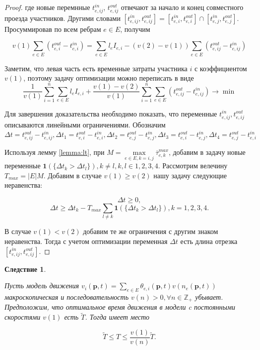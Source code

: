 \documentclass[12pt, a4paper]{article}
\DeclareMathOperator*{\minn}{min}
\newtheorem{corollary}{Следствие}[section]
\begin{document}
\begin{proof}
	где новые перемнные $t_{e, ij}^{in}$, $t_{e, ij}^{out}$ отвечают за начало и конец совместного проезда участников. Другими словами $[t_{e, ij}^{in}, t_{e, ij}^{out}] = [t_{e, i}^{in}, t_{e, i}^{out}] \cap [t_{e, j}^{in}, t_{e, j}^{out}]$. Просуммировав по всем ребрам $e \in E$, получим
	
	$$v(1) \sum \limits _{e \in E} (t_{e, i}^{out} - t_{e, i}^{in}) = \sum \limits _{e \in E} l_e I_{e, i} - (v(2) - v(1)) \sum \limits _{e \in E} (t_{e, ij}^{out} - t_{e, ij}^{in})$$
	
	Заметим, что левая часть есть временные затраты участника $i$ с коэффициентом $v(1)$, поэтому задачу оптимизации можно переписать в виде
	$$ \frac{1}{v (1)} \sum\limits_{i = 1}^n \sum \limits _{e \in E} l_e I_{e, i} + \frac{v(1) - v(2)}{v (1)}  \sum\limits_{i = 1}^n \sum \limits _{e \in E} (t_{e, ij}^{out} - t_{e, ij}^{in}) \rightarrow \minn $$
	
	Для завершения доказательства необходимо показать, что переменные $t_{e, ij}^{in}, t_{e, ij}^{out}$ описываются линейными ограничениями. Обозначим $\Delta t = t_{e, ij}^{out} - t_{e, ij}^{in}, \Delta t_1 =  t_{e, i}^{out} - t_{e, i}^{in}, \Delta t_2 =  t_{e, j}^{out} - t_{e, j}^{in}, \Delta t_3 =  t_{e, i}^{out} - t_{e, j}^{in}, \Delta t_4 =  t_{e, j}^{out} - t_{e, i}^{in}$
	
	Используя лемму \ref{lemma:lt}, при $M = \max\limits_{e \in E, k = i, j} \overline{\tau}_{e, k}^{max}$, добавим в задачу новые переменные $\textbf{1} (\{ \Delta t_k > \Delta t_l\}), k \ne l, k, l \in {1, 2, 3, 4}$. Рассмотрим велечину $T_{max} = |E|M$. Добавим в случае $v(1) \ge v(2)$ нашу задачу следующие неравенства: 
	
	$$\Delta t \ge 0, $$
	$$\Delta t \ge \Delta t_k - T_{max} \sum \limits_{l \ne k} {\textbf{1} (\{ \Delta t_k > \Delta t_l\})}, k = 1, 2, 3, 4.$$
	
	В случае $v(1) < v(2)$ добавим те же ограничения с другим знаком неравенства. Тогда с учетом оптимизации переменная $\Delta t$ есть длина отрезка $[t_{e, ij}^{in}, t_{e, ij}^{out}]$. 
	
\end{proof}

\begin{corollary}
	\label{corollary:rel}

	Пусть модель движения $ v_i(\textbf{p}, t) = \sum \limits _{e \in E} \theta_{e, i} (\textbf{p}, t) v (n_e (\textbf{p}, t))$ макроскопическая и последовательность $v(n) > 0, \forall n \in \mathbb{Z}_+$ убывает. Предположим, что оптимальное время движения в модели c постоянными скоростями $v(1)$ есть $\widetilde{T}$. Тогда имеет место

	$$ \widetilde{T} \le T \le \frac {v(1)}{v(n)} \widetilde{T}.$$
	
\end{corollary}
\end{document}
